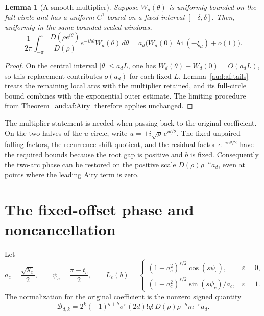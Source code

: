 \documentclass[11pt,a4paper]{article}
\numberwithin{equation}{section}
\newtheorem{lemma}[theorem]{Lemma}
\begin{document}
\begin{lemma}[A smooth multiplier]\label{aud:af:multiplier}
Suppose $W_d(\theta)$ is uniformly bounded on the full circle and has a uniform $C^1$ bound on a fixed interval $[-\delta,\delta]$. Then, uniformly in the same bounded scaled windows,
\begin{equation}\label{aud:af:weightedAiry}
 \frac1{2\pi}\int_{-\pi}^{\pi}
 \frac{D(\rho e^{i\theta})}{D(\rho)}e^{-ih\theta}W_d(\theta)\,d\theta
 =a_d\bigl(W_d(0)\operatorname{Ai}(-\xi_d)+o(1)\bigr).
\end{equation}
\end{lemma}
\begin{proof}
On the central interval $|\theta|\le a_dL$, one has
$W_d(\theta)-W_d(0)=O(a_dL)$, so this replacement contributes $o(a_d)$ for each fixed $L$. Lemma~\ref{aud:af:tails} treats the remaining local arcs with the multiplier retained, and its full-circle bound combines with the exponential outer estimate. The limiting procedure from Theorem~\ref{aud:af:Airy} therefore applies unchanged.
\end{proof}

The multiplier statement is needed when passing back to the original coefficient. On the two halves of the $u$ circle, write $u=\pm i\sqrt\rho\,e^{i\theta/2}$. The fixed unpaired falling factors, the recurrence-shift quotient, and the residual factor $e^{-i\varepsilon\theta/2}$ have the required bounds because the root gap is positive and $b$ is fixed. Consequently the two-arc phase can be restored on the positive scale $D(\rho)\rho^{-h}a_d$, even at points where the leading Airy term is zero.


\section{The fixed-offset phase and noncancellation}\label{aud:af:phasesection}
Let
\begin{equation}\label{aud:af:phaseconstants}
 a_c=\frac{\sqrt{y_c}}2,\qquad \psi_c=\frac{\pi-t_c}2,
 \qquad
 L_\varepsilon(b)=\begin{cases}
 (1+a_c^2)^{s/2}\cos(s\psi_c),&\varepsilon=0,\\
 (1+a_c^2)^{s/2}\sin(s\psi_c)/a_c,&\varepsilon=1.
 \end{cases}
\end{equation}
The normalization for the original coefficient is the nonzero signed quantity
\begin{equation}\label{aud:af:normalization}
 \mathcal B_{d,k}
 =2^k(-1)^{q+h}\sigma^\varepsilon(2d)!q!\,
 D(\rho)\rho^{-h}m^{-\varepsilon}a_d.
\end{equation}
\end{document}
